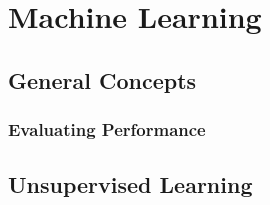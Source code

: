 \chapter{Machine Learning}
\label{ml}

\section{General Concepts}
\label{ml:general}

\subsection{Evaluating Performance}
\label{ml:general:eval}






\section{Unsupervised Learning}
\label{ml:unsupervised}


